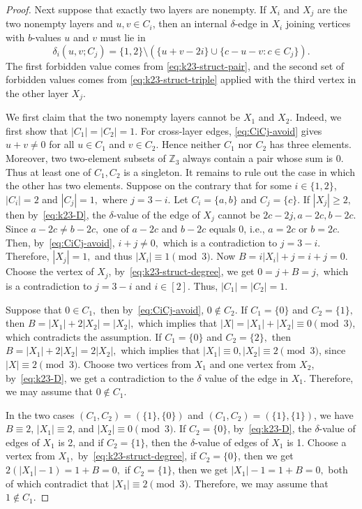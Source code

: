 ﻿\documentclass[11pt]{article}
\numberwithin{equation}{section}
\theoremstyle{remark}
\newcommand{\Z}{\mathbb Z}
\begin{document}
\begin{proof}
    Next suppose that exactly two layers are nonempty. If \(X_i\) and \(X_j\) are the two nonempty layers and \(u,v\in C_i\), then an internal \(\delta\)-edge in \(X_i\) joining vertices with \(b\)-values \(u\) and \(v\) must lie in
    \begin{equation}\label{eq:k23-D}
        \delta_i(u,v;C_j)
        =\{1,2\}
        \setminus (\{u+v-2i\}\cup \{c-u-v:c\in C_j\}).
    \end{equation}
    The first forbidden value comes from \eqref{eq:k23-struct-pair}, and the second set of forbidden values comes from \eqref{eq:k23-struct-triple} applied with the third vertex in the other layer $X_j$.

    We first claim that the two nonempty layers cannot be $X_1$ and $X_2.$
    Indeed, we first show that $|C_1|=|C_2|=1.$
    For cross-layer edges, \eqref{eq:CiCj-avoid} gives $u+v\ne0$ for all $u\in C_1$ and $v\in C_2$.
    Hence neither $C_1$ nor $C_2$ has three elements. Moreover, two two-element subsets of $\Z_3$ always contain a pair whose sum is $0$. Thus at least one of $C_1,C_2$ is a singleton. It remains to rule out the case in which the other has two elements.
    Suppose on the contrary that for some \(i\in\{1,2\}\), $|C_i|=2$ and $|C_j|=1,$ where $j=3-i.$
    Let $C_i=\{a,b\}$ and $C_j=\{c\}.$
    If $|X_j|\ge 2,$ then by~\eqref{eq:k23-D},
    the $\delta$-value of the edge of $X_j$ cannot be $2c-2j, a-2c, b-2c$. Since $a-2c\neq b-2c,$ one of $a-2c$ and $b-2c$ equals 0, i.e., $a=2c$ or $b=2c.$
    Then, by~\eqref{eq:CiCj-avoid}, $i+j\neq0,$ which is a contradiction to $j=3-i$.
    Therefore, $|X_j|=1,$ and thus $|X_i|\equiv1\pmod3$.
    Now $B=i|X_i|+j=i+j=0.$
    Choose the vertex of $X_j$, by~\eqref{eq:k23-struct-degree}, we get $0=j+B=j,$ which is a contradiction to $j=3-i$ and $i\in[2]$. Thus, $|C_1|=|C_2|=1.$

    Suppose that $0\in C_1,$ then by~\eqref{eq:CiCj-avoid}, $0\notin C_2$.
    If $C_1=\{0\}$ and $C_2=\{1\},$ then $B=|X_1|+2|X_2|=|X_2|,$ which implies that $|X|=|X_1|+|X_2|\equiv0\pmod3$, which contradicts the assumption.
    If $C_1=\{0\}$ and $C_2=\{2\},$ then $B=|X_1|+2|X_2|=2|X_2|,$ which implies that $|X_1|\equiv0, |X_2|\equiv2\pmod3$, since $|X|\equiv2\pmod3$.
    Choose two vertices from \(X_1\) and one vertex from $X_2$, by~\eqref{eq:k23-D}, we get a contradiction to the $\delta$ value of the edge in $X_1$.
    Therefore, we may assume that $0\notin C_1.$

    In the two cases \((C_1,C_2)=(\{1\},\{0\})\) and
    \((C_1,C_2)=(\{1\},\{1\})\), we have
    \(B\equiv2\), \(|X_1|\equiv2\), and \(|X_2|\equiv0\pmod3\).
    If \(C_2=\{0\}\), by~\eqref{eq:k23-D}, the $\delta$-value of edges of $X_1$ is 2, and if \(C_2=\{1\}\), then the $\delta$-value of edges of $X_1$ is 1.
    Choose a vertex from $X_1,$ by~\eqref{eq:k23-struct-degree}, if \(C_2=\{0\}\), then we get $2(|X_1|-1)=1+B=0,$
    if \(C_2=\{1\}\), then we get $|X_1|-1=1+B=0,$
    both of which contradict that $|X_1|\equiv2\pmod3$.
    Therefore, we may assume that $1\notin C_1.$


\end{proof}
\end{document}

